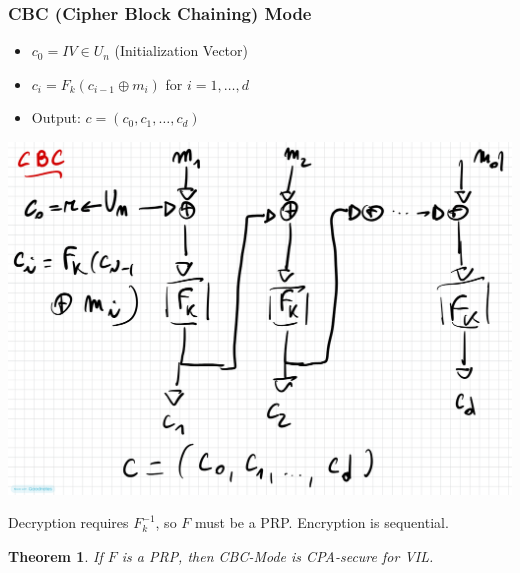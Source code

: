 \documentclass[11pt, a4paper]{article}
\newtheorem{thm}{Theorem}
\begin{document}
\subsubsection*{CBC (Cipher Block Chaining) Mode} 
\begin{itemize}
    \item $c_0 = IV \in U_n$ (Initialization Vector) 
    \item $c_i = F_k(c_{i-1} \oplus m_i)$ for $i=1, \dots, d$ 
    \item Output: $c = (c_0, c_1, \dots, c_d)$ 
\end{itemize}
\begin{center}
    \includegraphics[scale=0.4]{img/Symmetric/CBC.png}
\end{center}
Decryption requires $F_k^{-1}$, so $F$ must be a PRP. Encryption is sequential. 
\begin{thm}
If $F$ is a PRP, then CBC-Mode is CPA-secure for VIL. 
\end{thm}
\end{document}
